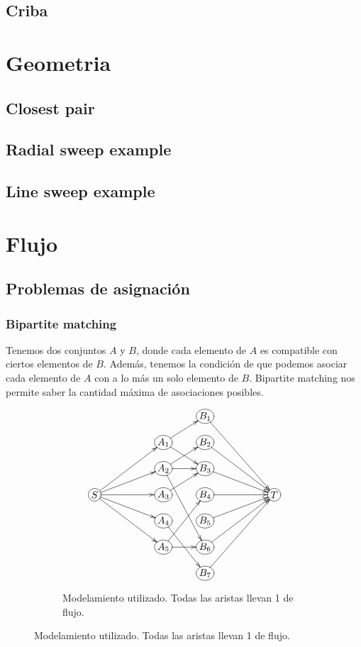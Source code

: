 \documentclass[oneside]{book}
\begin{document}
	\section{Criba}
	
	
	\chapter{Geometria}
	\section{Closest pair}
	
	\section{Radial sweep example}
	
	\section{Line sweep example}
	
	\chapter{Flujo}
	\section{Problemas de asignaci\'on}
	\subsection{Bipartite matching}
	Tenemos dos conjuntos $A$ y $B$, donde cada elemento de $A$ es compatible con ciertos elementos de $B$. Adem\'as, tenemos la condici\'on de que podemos asociar cada elemento de $A$ con a lo m\'as un solo elemento de $B$. Bipartite matching nos permite saber la cantidad m\'axima de asociaciones posibles.
\begin{figure}[h]
\centering
\begin{subfigure}{.5\textwidth}
\begin{displaymath}
\xymatrix@R-1pc{
&&&*+[o][F-]{B_1} \ar[dddrr] \\
&&*+[o][F-]{A_1} \ar[ur] \ar[dr]
&*+[o][F-]{B_2} \ar[ddrr] \\
&&*+[o][F-]{A_2} \ar[r] \ar[dddr] \ar[ur]
&*+[o][F-]{B_3} \ar[drr] \\
*+[o][F-]{S} \ar[rruu] \ar[rru] \ar[rr] \ar[rrd] \ar[rrdd]
&&*+[o][F-]{A_3} \ar[ur]
&*+[o][F-]{B_4} \ar[rr]
&&*+[o][F-]{T} \\
&&*+[o][F-]{A_4} \ar[ddr]
&*+[o][F-]{B_5} \ar[urr] \\
&&*+[o][F-]{A_5} \ar[r] \ar[uur]
&*+[o][F-]{B_6} \ar[uurr] \\
&&&*+[o][F-]{B_7} \ar[uuurr]
}
\end{displaymath}
\caption*{Modelamiento utilizado. Todas las aristas llevan 1 de flujo.}
\end{subfigure}
\end{figure}
\end{document}

